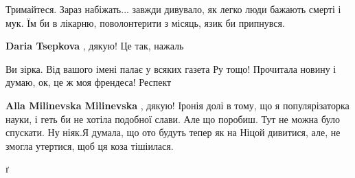 \begin{itemize}
\begin{itemize}
\end{itemize}

 

Тримайтеся. Зараз набіжать... завжди дивувало, як легко люди бажають смерті і
мук. Їм би в лікарню, поволонтерити з місяць, язик би припнувся.

\begin{itemize}
 
\textbf{Daria Tsepkova} , дякую! Це так, нажаль
\end{itemize}

 
Ви зірка. Від вашого імені палає у всяких газета Ру тощо! Прочитала новину і думаю, ок, це ж моя френдеса! Респект

\begin{itemize}
 
\textbf{Alla Milinevska Milinevska} , дякую! Іронія долі в тому, що я
популярізаторка науки, і геть би не хотіла подобної слави. Але що поробиш. Тут
не можна було спускати. Ну ніяк.Я думала, що ото будуть тепер як на Ніцой
дивитися, але, не змогла утертися, щоб ця коза тішіилася.

 
ґ

 

\end{itemize}
\end{itemize}
